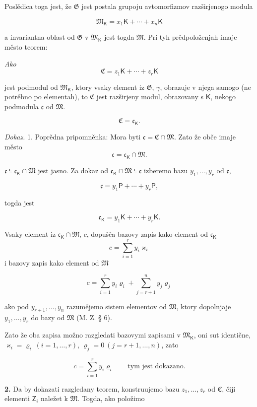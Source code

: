 \documentclass[11pt]{article}
\begin{document}
Poslědica toga jest, že \(\mathfrak G\) jest postala grupoju avtomorfizmov razširjenogo modula

\[
\mathfrak M_{\mathsf K}=x_1\mathsf K+\cdots+x_n\mathsf K
\]

a invariantna oblast od \(\mathfrak G\) v \(\mathfrak M_{\mathsf K}\) jest togda \(\mathfrak M\). Pri tyh prědpoloženjah imaje město teorem:

\begingroup\itshape
Ako
\[
\mathfrak C=z_1\mathsf K+\cdots+z_r\mathsf K
\]

jest podmodul od \(\mathfrak M_{\mathsf K}\), ktory vsaky element iz \(\mathfrak G\), \(\gamma\), obrazuje v njega samogo (ne potrěbno po elementah), to \(\mathfrak C\) jest razširjeny modul, obrazovany s \(\mathsf K\), nekogo podmodula \(\mathfrak c\) od \(\mathfrak M\).

\[
\mathfrak C=\mathfrak c_{\mathsf K}.
\]
\endgroup

\emph{Dokaz.} 1. Poprědna pripomněnka: Mora byti \(\mathfrak c=\mathfrak C\cap\mathfrak M\). Zato že obče imaje město
\[
\mathfrak c=\mathfrak c_{\mathsf K}\cap\mathfrak M.
\]

\(\mathfrak c\subseteqq\mathfrak c_{\mathsf K}\cap\mathfrak M\) jest jasno. Za dokaz od \(\mathfrak c_{\mathsf K}\cap\mathfrak M\subseteqq\mathfrak c\) izberemo bazu \(y_1,\ldots,y_r\) od \(\mathfrak c\),

\[
\mathfrak c=y_1\mathsf P+\cdots+y_r\mathsf P,
\]

togda jest

\[
\mathfrak c_{\mathsf K}=y_1\mathsf K+\cdots+y_r\mathsf K.
\]

Vsaky element iz \(\mathfrak c_{\mathsf K}\cap\mathfrak M\), \(c\), dopušča bazovy zapis kako element od \(\mathfrak c_{\mathsf K}\)
\[
c=\sum_{i=1}^{r}y_i\varkappa_i
\]
i bazovy zapis kako element od \(\mathfrak M\)

\[
c=\sum_{i=1}^{r}y_i\varrho_i+\sum_{j=r+1}^{n}y_j\varrho_j
\]

ako pod \(y_{r+1},\ldots,y_n\) razumějemo sistem elementov od \(\mathfrak M\), ktory dopolnjaje \(y_1,\ldots,y_r\) do bazy od \(\mathfrak M\) (M. Z. § 6).

Zato že oba zapisa možno razgledati bazovymi zapisami v \(\mathfrak M_{\mathsf K}\), oni sut identične, \(\varkappa_i=\varrho_i\ (i=1,\ldots,r)\), \(\varrho_j=0\ (j=r+1,\ldots,n)\), zato

\[
c=\sum_{i=1}^{r}y_i\varrho_i
\qquad\text{tym jest dokazano.}
\]

\textbf{2.} Da by dokazati razgledany teorem, konstruujemo bazu \(z_1,\ldots,z_r\) od \(\mathfrak C\), čiji elementi \(\mathsf{Z}_i\) naležet k \(\mathfrak M\). Togda, ako položimo
\end{document}
